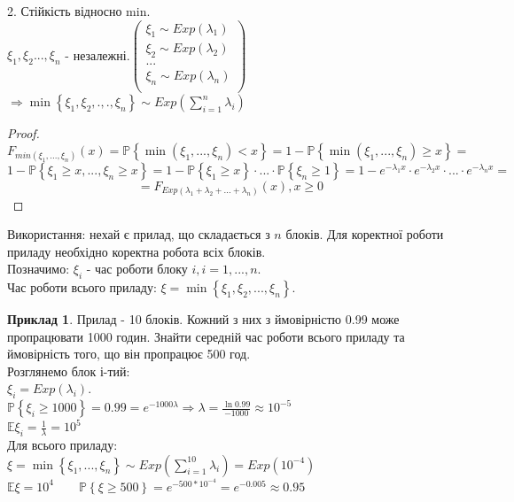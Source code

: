 \documentclass[14pt,a4paper]{scrartcl}
\theoremstyle{definition}
\newtheorem*{example}{Приклад}
\theoremstyle{remark}
\theoremstyle{definition}
\theoremstyle{definition}
\begin{document}
2. Стійкість відносно min.\\
$ \xi_1, \xi_2 ... , \xi_n$ - незалежні.$ \left(  \begin{gathered}
\xi_1 \sim Exp(\lambda_1) \\
 \xi_2 \sim Exp(\lambda_2) \\
 ...\\
 \xi_n \sim Exp(\lambda_n) \\
\end{gathered} \right) $  $ \Rightarrow \min \left\lbrace  \xi_1 , \xi_2, .,. , \xi_n \right\rbrace  \sim Exp (  \sum\limits_{i = 1}^{ n}{ \lambda_i})$
\begin{proof}

$$
F_{min(\xi_1, ..., \xi_n)} (x) = \mathbb{P} \left\lbrace \min \left(\xi_1, ... , \xi_n  \right) < x  \right\rbrace  = 1 - \mathbb{P} \left\lbrace \min \left(\xi_1, ... , \xi_n  \right) \geq  x  \right\rbrace =
$$
$$
1 - \mathbb{P} \left\lbrace  \xi_1 \geq x, ... , \xi_n \geq x \right\rbrace = 1 - \mathbb{P} \left\lbrace \xi_1 \geq  x \right\rbrace \cdot ... \cdot \mathbb{P} \left\lbrace   \xi_n \geq 1\right\rbrace = 1 - e ^ { - \lambda_1 x} \cdot e^ { -\lambda_2 x} \cdot ... \cdot e^{- \lambda_n x} =
$$
$$
 = F_{Exp(\lambda_1 + \lambda_2 + ... + \lambda_n)} (x), x\geq 0
$$

\end{proof}
Використання: нехай є прилад, що складається з $n$ блоків. Для коректної роботи приладу необхідно коректна робота всіх блоків. \\
Позначимо: $\xi_i$ - час роботи блоку $i, i = 1, ..., n$.\\
Час роботи всього приладу: $ \xi = \min \left\lbrace \xi_1, \xi_2, ..., \xi_n \right\rbrace $.
\begin{example}
	Прилад - 10 блоків. Кожний з них з ймовірністю 0.99 може пропрацювати 1000 годин. Знайти середній час роботи всього приладу та ймовірність того, що він пропрацює 500 год.\\
	Розглянемо блок і-тий: \\$ \xi_i = Exp(\lambda_i)$.\\
	$\mathbb{P} \left\lbrace \xi_i \geq 1000 \right\rbrace = 0.99 = e ^ {-1000 \lambda} \Longrightarrow \lambda = \frac{ \ln{0.99}}{-1000} \approx 10^{-5}$\\
	$\mathbb{E} \xi_i = \frac{1}{\lambda} = 10^5 $\\
	Для всього приладу:\\
	$ \xi = \min \left\lbrace \xi_1, ... , \xi_n \right\rbrace  \sim Exp( \sum\limits_{i = 1}^{ 10}{\lambda_i}) = Exp(10^{-4})$\\
	$ \mathbb{E}\xi = 10^4 \qquad \mathbb{P} \left\lbrace \xi \geq 500 \right\rbrace = e^{-500 * 10^{-4}} = e^{-0.005} \approx 0.95$
\end{example}
\end{document}
